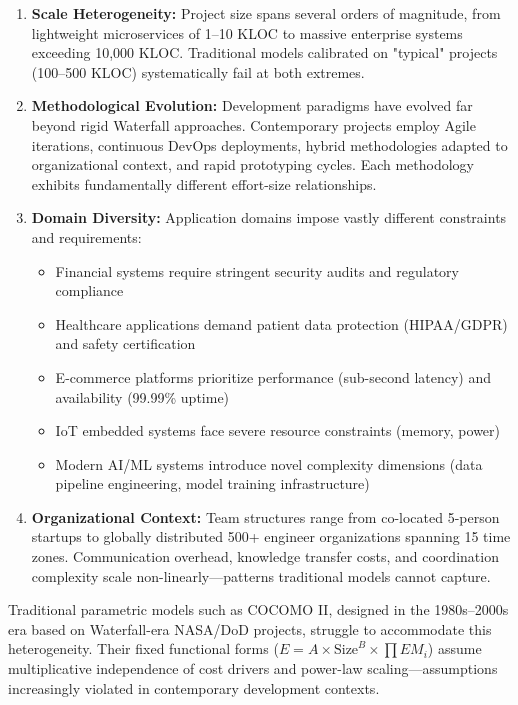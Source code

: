 \documentclass[11pt,a4paper]{article}
\begin{document}
\begin{enumerate}[leftmargin=2em]
    \item \textbf{Scale Heterogeneity:} Project size spans several orders of magnitude, from lightweight microservices of 1--10 KLOC to massive enterprise systems exceeding 10,000 KLOC. Traditional models calibrated on "typical" projects (100--500 KLOC) systematically fail at both extremes.
    
    \item \textbf{Methodological Evolution:} Development paradigms have evolved far beyond rigid Waterfall approaches. Contemporary projects employ Agile iterations, continuous DevOps deployments, hybrid methodologies adapted to organizational context, and rapid prototyping cycles. Each methodology exhibits fundamentally different effort-size relationships.
    
    \item \textbf{Domain Diversity:} Application domains impose vastly different constraints and requirements:
    \begin{itemize}
        \item Financial systems require stringent security audits and regulatory compliance
        \item Healthcare applications demand patient data protection (HIPAA/GDPR) and safety certification
        \item E-commerce platforms prioritize performance (sub-second latency) and availability (99.99\% uptime)
        \item IoT embedded systems face severe resource constraints (memory, power)
        \item Modern AI/ML systems introduce novel complexity dimensions (data pipeline engineering, model training infrastructure)
    \end{itemize}
    
    \item \textbf{Organizational Context:} Team structures range from co-located 5-person startups to globally distributed 500+ engineer organizations spanning 15 time zones. Communication overhead, knowledge transfer costs, and coordination complexity scale non-linearly---patterns traditional models cannot capture.
\end{enumerate}

Traditional parametric models such as COCOMO II, designed in the 1980s--2000s era based on Waterfall-era NASA/DoD projects, struggle to accommodate this heterogeneity. Their fixed functional forms ($E = A \times \text{Size}^B \times \prod EM_i$) assume multiplicative independence of cost drivers and power-law scaling---assumptions increasingly violated in contemporary development contexts.
\end{document}
